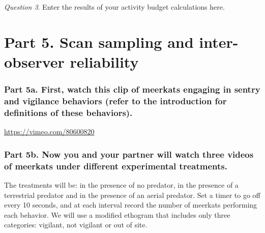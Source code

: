 \documentclass[]{book}
\begin{document}
\emph{Question 3}. Enter the results of your activity budget calculations here.

\hypertarget{part-5.-scan-sampling-and-inter-observer-reliability}{%
\section*{Part 5. Scan sampling and inter-observer reliability}\label{part-5.-scan-sampling-and-inter-observer-reliability}}

\hypertarget{part-5a.-first-watch-this-clip-of-meerkats-engaging-in-sentry-and-vigilance-behaviors-refer-to-the-introduction-for-definitions-of-these-behaviors.}{%
\subsubsection*{Part 5a. First, watch this clip of meerkats engaging in sentry and vigilance behaviors (refer to the introduction for definitions of these behaviors).}\label{part-5a.-first-watch-this-clip-of-meerkats-engaging-in-sentry-and-vigilance-behaviors-refer-to-the-introduction-for-definitions-of-these-behaviors.}}

\url{https://vimeo.com/80600820}

\hypertarget{part-5b.-now-you-and-your-partner-will-watch-three-videos-of-meerkats-under-different-experimental-treatments.}{%
\subsubsection*{Part 5b. Now you and your partner will watch three videos of meerkats under different experimental treatments.}\label{part-5b.-now-you-and-your-partner-will-watch-three-videos-of-meerkats-under-different-experimental-treatments.}}

The treatments will be: in the presence of no predator, in the presence of a terrestrial predator and in the presence of an aerial predator. Set a timer to go off every 10 seconds, and at each interval record the number of meerkats performing each behavior. We will use a modified ethogram that includes only three categories: vigilant, not vigilant or out of site.
\end{document}
